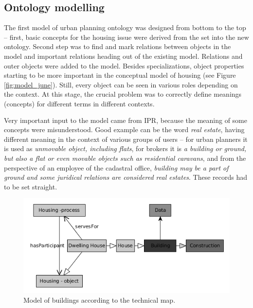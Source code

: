\documentclass{lncs-template/llncs}
\begin{document}
\subsection{Ontology modelling}\label{sec:modelling}

The first model of urban planning ontology was designed from bottom to the top -- first, basic concepts for the housing issue were derived from the set into the new ontology. Second step was to find and mark relations between objects in the model and important relations heading out of the existing model. Relations and outer objects were added to the model. Besides specializations, object properties starting to be more important in the conceptual model of housing (see Figure \ref{fig:model_june}). Still, every object can be seen in various roles depending on the context. At this stage, the crucial problem was to correctly define meanings (concepts) for different terms in different contexts.

Very important input to the model came from IPR, because the meaning of some concepts were misunderstood. Good example can be the word \emph{real estate}, having different meaning in the context of various groups of users -- for urban planners it is used as \emph{unmovable object, including flats}, for brokers it is \emph{a building or ground, but also a flat or even movable objects such as residential caravans}, and from the perspective of an employee of the cadastral office, \emph{building may be a part of ground and some juridical relations are considered real estates}. These records had to be set straight.


\begin{figure}
 \includegraphics[width=1.0\textwidth]{images/BUILDINGS.png}
 \caption{Model of buildings according to the technical map.}\label{fig:dat_buil}
\end{figure}
\end{document}
